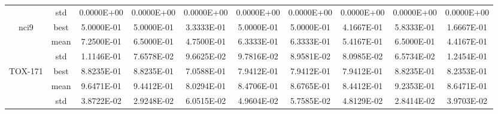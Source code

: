 \documentclass{wzuthesis}
\begin{document}
\begin{table}[htbp]
\begin{tabular}{cccccccccc}
          & std   & 0.0000E+00 & 0.0000E+00 & 0.0000E+00 & 0.0000E+00 & 0.0000E+00 & 0.0000E+00 & 0.0000E+00 & 0.0000E+00 \\
    \multirow{3}[0]{*}{nci9} & best  & 5.0000E-01 & 5.0000E-01 & 3.3333E-01 & 5.0000E-01 & 5.0000E-01 & 4.1667E-01 & 5.8333E-01 & 1.6667E-01 \\
          & mean  & 7.2500E-01 & 6.5000E-01 & 4.7500E-01 & 6.3333E-01 & 6.3333E-01 & 5.4167E-01 & 6.5000E-01 & 4.4167E-01 \\
          & std   & 1.1146E-01 & 7.6578E-02 & 9.6625E-02 & 9.7816E-02 & 8.9581E-02 & 8.0985E-02 & 6.5734E-02 & 1.2454E-01 \\
    \multirow{3}[0]{*}{TOX-171} & best  & 8.8235E-01 & 8.8235E-01 & 7.0588E-01 & 7.9412E-01 & 7.9412E-01 & 7.9412E-01 & 8.8235E-01 & 8.2353E-01 \\
          & mean  & 9.6471E-01 & 9.4412E-01 & 8.0294E-01 & 8.4706E-01 & 8.6765E-01 & 8.4412E-01 & 9.2353E-01 & 8.6471E-01 \\
          & std   & 3.8722E-02 & 2.9248E-02 & 6.0515E-02 & 4.9604E-02 & 5.7585E-02 & 4.8129E-02 & 2.8414E-02 & 3.9703E-02 \\
    \bottomrule      
    \end{tabular}%
  \label{tb:FS-acc}%
\end{table}%
\end{document}
